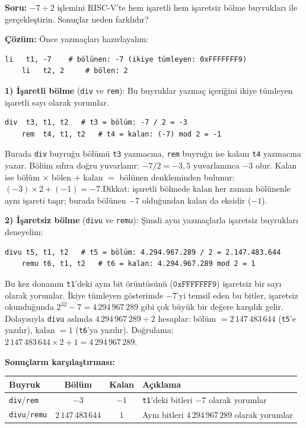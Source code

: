 \begin{ornek}[5.14]
\textbf{Soru:} $-7 \div 2$ işlemini RISC-V'te hem işaretli hem işaretsiz bölme buyrukları ile gerçekleştirin. Sonuçlar neden farklıdır?

\textbf{Çözüm:} Önce yazmaçları hazırlayalım:

\begin{lstlisting}[style=riscv]
    li   t1, -7    # bölünen: -7 (ikiye tümleyen: 0xFFFFFFF9)
    li   t2, 2     # bölen: 2
\end{lstlisting}

\textbf{1) İşaretli bölme} (\texttt{div} ve \texttt{rem}): Bu buyruklar yazmaç içeriğini ikiye tümleyen işaretli sayı olarak yorumlar.

\begin{lstlisting}[style=riscv]
    div  t3, t1, t2   # t3 = bölüm: -7 / 2 = -3
    rem  t4, t1, t2   # t4 = kalan: (-7) mod 2 = -1
\end{lstlisting}

Burada \texttt{div} buyruğu bölümü \texttt{t3} yazmacına, \texttt{rem} buyruğu ise kalanı \texttt{t4} yazmacına yazar. Bölüm sıfıra doğru yuvarlanır: $-7 / 2 = -3{,}5$ yuvarlanınca $-3$ olur. Kalan ise bölüm $\times$ bölen $+$ kalan $=$ bölünen denkleminden bulunur: $(-3) \times 2 + (-1) = -7$.\;\checkmark\quad Dikkat: işaretli bölmede kalan her zaman bölünenle aynı işareti taşır; burada bölünen $-7$ olduğundan kalan da eksidir ($-1$).

\textbf{2) İşaretsiz bölme} (\texttt{divu} ve \texttt{remu}): Şimdi aynı yazmaçlarla işaretsiz buyrukları deneyelim:

\begin{lstlisting}[style=riscv]
    divu t5, t1, t2   # t5 = bölüm: 4.294.967.289 / 2 = 2.147.483.644
    remu t6, t1, t2   # t6 = kalan: 4.294.967.289 mod 2 = 1
\end{lstlisting}

Bu kez donanım \texttt{t1}'deki aynı bit örüntüsünü ($\texttt{0xFFFFFFF9}$) işaretsiz bir sayı olarak yorumlar. İkiye tümleyen gösterimde $-7$'yi temsil eden bu bitler, işaretsiz okunduğunda $2^{32} - 7 = 4\,294\,967\,289$ gibi çok büyük bir değere karşılık gelir. Dolayısıyla \texttt{divu} aslında $4\,294\,967\,289 \div 2$ hesaplar: bölüm $= 2\,147\,483\,644$ (\texttt{t5}'e yazılır), kalan $= 1$ (\texttt{t6}'ya yazılır). Doğrulama: $2\,147\,483\,644 \times 2 + 1 = 4\,294\,967\,289$.\;\checkmark

\textbf{Sonuçların karşılaştırması:}

\begin{center}
\small
\begin{tabular}{l c c l}
\toprule
\textbf{Buyruk} & \textbf{Bölüm} & \textbf{Kalan} & \textbf{Açıklama} \\
\midrule
\texttt{div}/\texttt{rem} & $-3$ & $-1$ & \texttt{t1}'deki bitleri $-7$ olarak yorumlar \\
\texttt{divu}/\texttt{remu} & $2\,147\,483\,644$ & $1$ & Aynı bitleri $4\,294\,967\,289$ olarak yorumlar \\
\bottomrule
\end{tabular}
\end{center}


\end{ornek}
